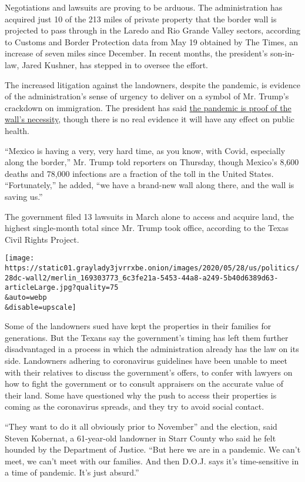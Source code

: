 Negotiations and lawsuits are proving to be arduous. The administration
has acquired just 10 of the 213 miles of private property that the
border wall is projected to pass through in the Laredo and Rio Grande
Valley sectors, according to Customs and Border Protection data from May
19 obtained by The Times, an increase of seven miles since December. In
recent months, the president's son-in-law, Jared Kushner, has stepped in
to oversee the effort.

The increased litigation against the landowners, despite the pandemic,
is evidence of the administration's sense of urgency to deliver on a
symbol of Mr. Trump's crackdown on immigration. The president has said
\href{https://www.nytimes3xbfgragh.onion/2020/02/29/us/politics/trump-rally-coronavirus.html}{the
pandemic is proof of the wall's necessity}, though there is no real
evidence it will have any effect on public health.

``Mexico is having a very, very hard time, as you know, with Covid,
especially along the border,'' Mr. Trump told reporters on Thursday,
though Mexico's 8,600 deaths and 78,000 infections are a fraction of the
toll in the United States. ``Fortunately,'' he added, ``we have a
brand-new wall along there, and the wall is saving us.''

The government filed 13 lawsuits in March alone to access and acquire
land, the highest single-month total since Mr. Trump took office,
according to the Texas Civil Rights Project.

\texttt{[image: https://static01.graylady3jvrrxbe.onion/images/2020/05/28/us/politics/28dc-wall2/merlin\_169303773\_6c3fe21a-5453-44a8-a249-5b40d6389d63-articleLarge.jpg?quality=75\\\&auto=webp\\\&disable=upscale]}

Some of the landowners sued have kept the properties in their families
for generations. But the Texans say the government's timing has left
them further disadvantaged in a process in which the administration
already has the law on its side. Landowners adhering to coronavirus
guidelines have been unable to meet with their relatives to discuss the
government's offers, to confer with lawyers on how to fight the
government or to consult appraisers on the accurate value of their land.
Some have questioned why the push to access their properties is coming
as the coronavirus spreads, and they try to avoid social contact.

``They want to do it all obviously prior to November'' and the election,
said Steven Kobernat, a 61-year-old landowner in Starr County who said
he felt hounded by the Department of Justice. ``But here we are in a
pandemic. We can't meet, we can't meet with our families. And then
D.O.J. says it's time-sensitive in a time of pandemic. It's just
absurd.''

